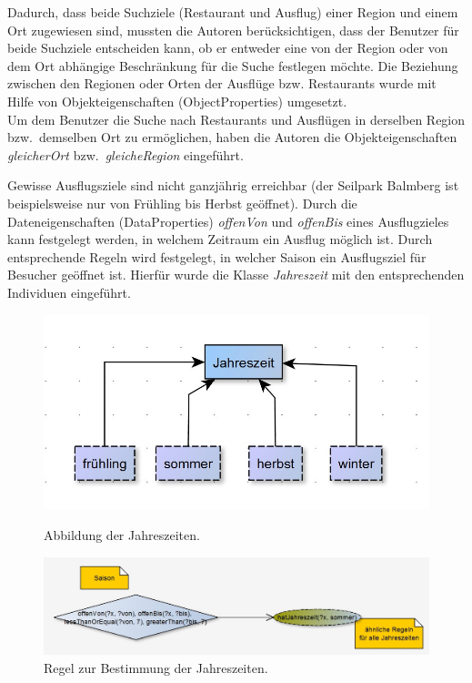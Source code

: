Dadurch, dass beide Suchziele (Restaurant und Ausflug) einer Region und einem Ort zugewiesen sind, mussten die Autoren berücksichtigen, dass der Benutzer für beide Suchziele entscheiden kann, ob er entweder eine von der Region oder von dem Ort abhängige Beschränkung für die Suche festlegen möchte. Die Beziehung zwischen den Regionen oder Orten der Ausflüge bzw. Restaurants wurde mit Hilfe von Objekteigenschaften (ObjectProperties) umgesetzt.\\
Um dem Benutzer die Suche nach Restaurants und Ausflügen in derselben Region bzw.\ demselben Ort zu ermöglichen, haben die Autoren die Objekteigenschaften \textit{gleicherOrt} bzw.\ \textit{gleicheRegion} eingeführt.

Gewisse Ausflugsziele sind nicht ganzjährig erreichbar (der Seilpark Balmberg ist beispielsweise nur von Frühling bis Herbst geöffnet). Durch die Dateneigenschaften (DataProperties) \textit{offenVon} und \textit{offenBis} eines Ausflugzieles kann festgelegt werden, in welchem Zeitraum ein Ausflug möglich ist. Durch entsprechende Regeln wird festgelegt, in welcher Saison ein Ausflugsziel für Besucher geöffnet ist. Hierfür wurde die Klasse \textit{Jahreszeit} mit den entsprechenden Individuen eingeführt.\\
    \begin{figure}[H]%
        \begin{minipage}[hbt]{0,49\textwidth}
            \centering
            \includegraphics[scale=0.3]{bilder/SaisonKlasse.jpg}
            \caption{Abbildung der Jahreszeiten.\label{fig:SaisonKlasse}\protect\footnotemark}
        \end{minipage}
        \begin{minipage}[hbt]{0,49\textwidth}
            \centering
            \includegraphics[scale=0.3]{bilder/SaisonRegeln.jpg}
            \caption{Regel zur Bestimmung der Jahreszeiten.\label{fig:SaisonRegeln}\protect\footnotemark[2]}
        \end{minipage}
    \end{figure}


